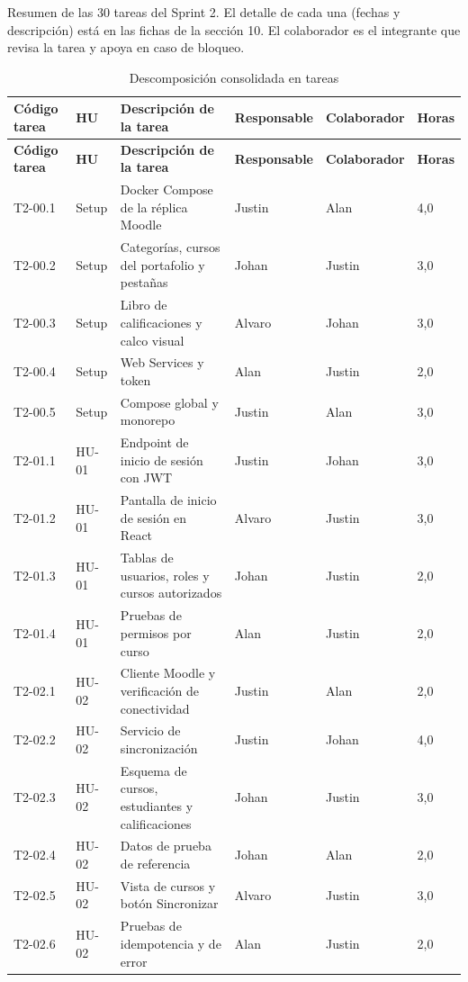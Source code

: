 \documentclass[11pt,a4paper]{article}
\newcommand{\hd}[1]{\textbf{#1}}
\begin{document}
Resumen de las 30 tareas del Sprint 2. El detalle de cada una (fechas y descripción) está en las fichas de la sección 10. El colaborador es el integrante que revisa la tarea y apoya en caso de bloqueo.

\begin{longtable}{|R{1.5cm}|R{1.3cm}|R{5.0cm}|R{1.9cm}|R{1.9cm}|R{1.5cm}|}
\caption{Descomposición consolidada en tareas}\\
\hline \hd{Código tarea} & \hd{HU} & \hd{Descripción de la tarea} & \hd{Responsable} & \hd{Colaborador} & \hd{Horas}\\ \hline \endfirsthead
\hline \hd{Código tarea} & \hd{HU} & \hd{Descripción de la tarea} & \hd{Responsable} & \hd{Colaborador} & \hd{Horas}\\ \hline \endhead
T2-00.1 & Setup & Docker Compose de la réplica Moodle & Justin & Alan & 4,0\\ \hline
T2-00.2 & Setup & Categorías, cursos del portafolio y pestañas & Johan & Justin & 3,0\\ \hline
T2-00.3 & Setup & Libro de calificaciones y calco visual & Alvaro & Johan & 3,0\\ \hline
T2-00.4 & Setup & Web Services y token & Alan & Justin & 2,0\\ \hline
T2-00.5 & Setup & Compose global y monorepo & Justin & Alan & 3,0\\ \hline
T2-01.1 & HU-01 & Endpoint de inicio de sesión con JWT & Justin & Johan & 3,0\\ \hline
T2-01.2 & HU-01 & Pantalla de inicio de sesión en React & Alvaro & Justin & 3,0\\ \hline
T2-01.3 & HU-01 & Tablas de usuarios, roles y cursos autorizados & Johan & Justin & 2,0\\ \hline
T2-01.4 & HU-01 & Pruebas de permisos por curso & Alan & Justin & 2,0\\ \hline
T2-02.1 & HU-02 & Cliente Moodle y verificación de conectividad & Justin & Alan & 2,0\\ \hline
T2-02.2 & HU-02 & Servicio de sincronización & Justin & Johan & 4,0\\ \hline
T2-02.3 & HU-02 & Esquema de cursos, estudiantes y calificaciones & Johan & Justin & 3,0\\ \hline
T2-02.4 & HU-02 & Datos de prueba de referencia & Johan & Alan & 2,0\\ \hline
T2-02.5 & HU-02 & Vista de cursos y botón Sincronizar & Alvaro & Justin & 3,0\\ \hline
T2-02.6 & HU-02 & Pruebas de idempotencia y de error & Alan & Justin & 2,0\\ \hline

\end{longtable}
\end{document}
